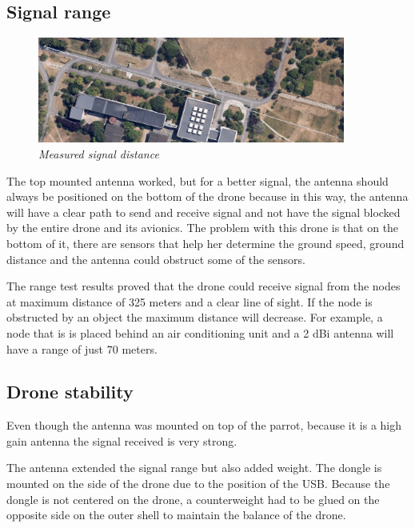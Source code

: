 \subsection{Signal range}

\begin{figure}[ht]
\begin{center}
\includegraphics[width=0.9\textwidth]{img/distance.png}
\end{center}
\caption{\small \itshape{Measured signal distance}}
\end{figure}


The top mounted antenna worked, but for a better signal, the antenna should always be positioned on the bottom of the drone because in this way, the antenna will have a clear path to send and receive signal and not have the signal blocked by the entire drone and its avionics. The problem with this drone is that on the bottom of it, there are sensors that help her determine the ground speed, ground distance and the antenna could obstruct some of the sensors.

The range test results proved that the drone could receive signal from the nodes at maximum distance of 325 meters and a clear line of sight. If the node is obstructed by an object the maximum distance will decrease. For example, a node that is is placed behind an air conditioning unit and a 2 dBi antenna will have a range of just 70 meters.


\subsection{Drone stability}

Even though the antenna was mounted on top of the parrot, because it is a high gain antenna the signal received is very strong. 

The antenna extended the signal range but also added weight. The dongle is mounted on the side of the drone due to the position of the USB. Because the dongle is not centered on the drone, a counterweight had to be glued on the opposite side on the outer shell to maintain the balance of the drone. 

